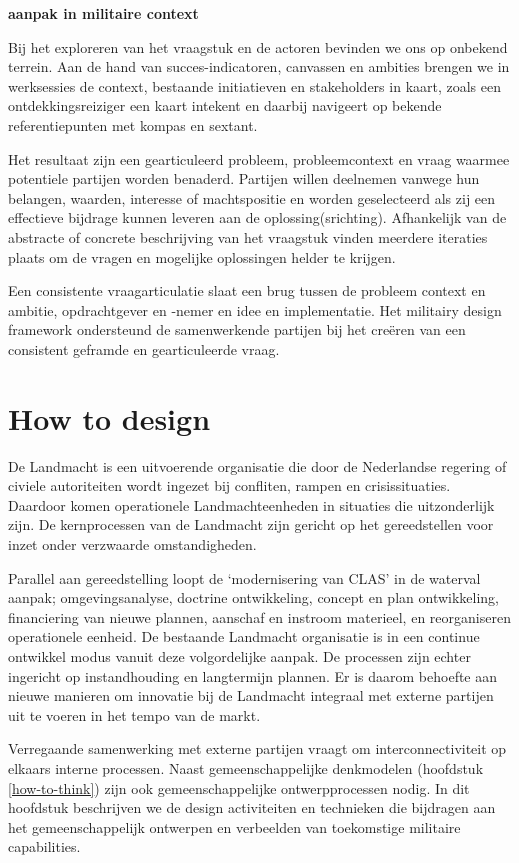 \documentclass[
]{book}
\begin{document}
\textbf{aanpak in militaire context}

Bij het exploreren van het vraagstuk en de actoren bevinden we ons op onbekend terrein. Aan de hand van succes-indicatoren, canvassen en ambities brengen we in werksessies de context, bestaande initiatieven en stakeholders in kaart, zoals een ontdekkingsreiziger een kaart intekent en daarbij navigeert op bekende referentiepunten met kompas en sextant.

Het resultaat zijn een gearticuleerd probleem, probleemcontext en vraag waarmee potentiele partijen worden benaderd. Partijen willen deelnemen vanwege hun belangen, waarden, interesse of machtspositie en worden geselecteerd als zij een effectieve bijdrage kunnen leveren aan de oplossing(srichting). Afhankelijk van de abstracte of concrete beschrijving van het vraagstuk vinden meerdere iteraties plaats om de vragen en mogelijke oplossingen helder te krijgen.

Een consistente vraagarticulatie slaat een brug tussen de probleem context en ambitie, opdrachtgever en -nemer en idee en implementatie. Het militairy design framework ondersteund de samenwerkende partijen bij het creëren van een consistent geframde en gearticuleerde vraag.

\hypertarget{how-to-design}{%
\chapter{How to design}\label{how-to-design}}

De Landmacht is een uitvoerende organisatie die door de Nederlandse regering of civiele autoriteiten wordt ingezet bij confliten, rampen en crisissituaties. Daardoor komen operationele Landmachteenheden in situaties die uitzonderlijk zijn. De kernprocessen van de Landmacht zijn gericht op het gereedstellen voor inzet onder verzwaarde omstandigheden.

Parallel aan gereedstelling loopt de `modernisering van CLAS' in de waterval aanpak; omgevingsanalyse, doctrine ontwikkeling, concept en plan ontwikkeling, financiering van nieuwe plannen, aanschaf en instroom materieel, en reorganiseren operationele eenheid. De bestaande Landmacht organisatie is in een continue ontwikkel modus vanuit deze volgordelijke aanpak. De processen zijn echter ingericht op instandhouding en langtermijn plannen. Er is daarom behoefte aan nieuwe manieren om innovatie bij de Landmacht integraal met externe partijen uit te voeren in het tempo van de markt.

Verregaande samenwerking met externe partijen vraagt om interconnectiviteit op elkaars interne processen. Naast gemeenschappelijke denkmodelen (hoofdstuk \ref{how-to-think}) zijn ook gemeenschappelijke ontwerpprocessen nodig. In dit hoofdstuk beschrijven we de design activiteiten en technieken die bijdragen aan het gemeenschappelijk ontwerpen en verbeelden van toekomstige militaire capabilities.
\end{document}
